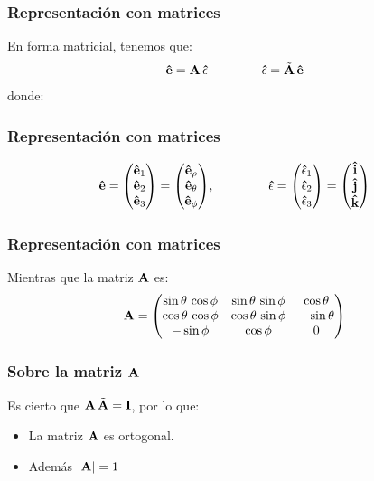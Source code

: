 \documentclass[12pt]{beamer}
\begin{document}
\begin{frame}
\frametitle{Representación con matrices}
En forma matricial, tenemos que:
\pause
\begin{align*}
\vu{e} = \vb{A} \, \vu{\epsilon} \hspace{1.5cm} \vu{\epsilon} = \tilde{\vb{A}} \, \vu{e}
\end{align*}
donde:
\end{frame}
\begin{frame}
\frametitle{Representación con matrices}
\begin{align*}
\vu{e} = \mqty(
\vu{e}_{1} \\
\vu{e}_{2} \\
\vu{e}_{3})
= \mqty(
\vu{e}_{\rho} \\
\vu{e}_{\theta} \\
\vu{e}_{\phi}), \hspace{1.5cm}
\vu{\epsilon} = \mqty(
\vu{\epsilon}_{1} \\
\vu{\epsilon}_{2} \\
\vu{\epsilon}_{3}) = \mqty(
\vu{i} \\
\vu{j} \\
\vu{k})
\end{align*}
\end{frame}
\begin{frame}
\frametitle{Representación con matrices}
Mientras que la matriz $\vb{A}$ es:
\pause
\begin{align*}
\vb{A} = \mqty(
\sin \theta \, \cos \phi & \sin \theta \, \sin \phi & \cos \theta \\
\cos \theta \, \cos \phi & \cos \theta \, \sin \phi & - \sin \theta \\
- \sin \phi & \cos \phi & 0
)
\end{align*}
\end{frame}
\begin{frame}
\frametitle{Sobre la matriz $\vb{A}$}
Es cierto que $\vb{A} \, \tilde{\vb{A}} = \vb{I}$, \pause por lo que:
\pause
\begin{itemize}
\item[\ding{212}] La matriz $\vb{A}$ es ortogonal.
\item[\ding{212}] Además $\abs{\vb{A}} = 1$  
\end{itemize}
\end{frame}

\end{document}
